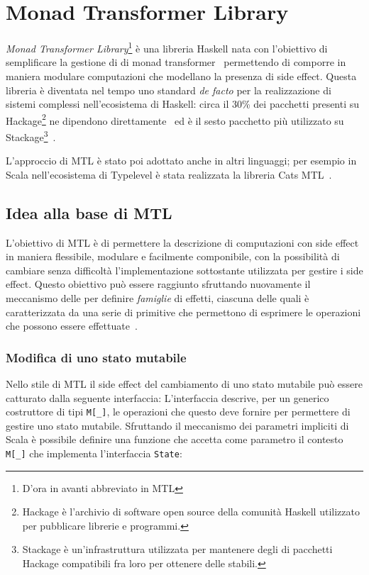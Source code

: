 \section{Monad Transformer Library}

\emph{Monad Transformer Library}\footnote{D'ora in avanti abbreviato in MTL} è una libreria Haskell nata con l'obiettivo di semplificare la gestione di  di monad transformer~\cite{cit:mtl} permettendo di comporre in maniera modulare computazioni che modellano la presenza di side effect.
Questa libreria è diventata nel tempo uno standard \emph{de facto} per la realizzazione di sistemi complessi nell'ecosistema di Haskell: circa il 30\% dei pacchetti presenti su Hackage\footnote{Hackage è l'archivio di software open source della comunità Haskell utilizzato per pubblicare librerie e programmi.} ne dipendono direttamente~\cite{cit:which-monads-haskell-developers-use-an-exploratory-study} ed è il sesto pacchetto più utilizzato su Stackage\footnote{Stackage è un'infrastruttura utilizzata per mantenere degli  di pacchetti Hackage compatibili fra loro per ottenere delle  stabili.}~\cite{cit:evolution-of-a-haskell-repository-and-its-use-of-monads-an-exploratory-study-of-stackage}.

L'approccio di MTL è stato poi adottato anche in altri linguaggi; per esempio in Scala nell'ecosistema di Typelevel è stata realizzata la libreria Cats MTL~\cite{cit:cats-mtl}.

\subsection{Idea alla base di MTL}
L'obiettivo di MTL è di permettere la descrizione di computazioni con side effect in maniera flessibile, modulare e facilmente componibile, con la possibilità di cambiare senza difficoltà l'implementazione sottostante utilizzata per gestire i side effect.
Questo obiettivo può essere raggiunto sfruttando nuovamente il meccanismo delle  per definire \emph{famiglie} di effetti, ciascuna delle quali è caratterizzata da una serie di primitive che permettono di esprimere le operazioni che possono essere effettuate~\cite{cit:functional-programming-with-overloading-and-higher-order-polymorphism}.

\subsubsection{Modifica di uno stato mutabile}
Nello stile di MTL il side effect del cambiamento di uno stato mutabile può essere catturato dalla seguente interfaccia:
L'interfaccia descrive, per un generico costruttore di tipi \lstinline{M[_]}, le operazioni che questo deve fornire per permettere di gestire uno stato mutabile.
Sfruttando il meccanismo dei parametri impliciti di Scala è possibile definire una funzione che accetta come parametro il contesto \lstinline{M[_]} che implementa l'interfaccia \lstinline{State}:

